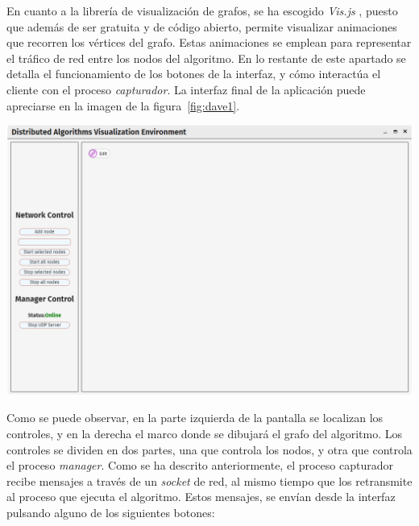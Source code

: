 En cuanto a la librería de visualización de grafos, se ha escogido \textit{Vis.js} \cite{visjs}, puesto que además de ser gratuita y de código abierto, permite visualizar animaciones que recorren los vértices del grafo. Estas animaciones se emplean para representar el tráfico de red entre los nodos del algoritmo. En lo restante de este apartado se detalla el funcionamiento de los botones de la interfaz, y cómo interactúa el cliente con el proceso \textit{capturador}. La interfaz final de la aplicación puede apreciarse en la imagen de la figura~\ref{fig:dave1}.

{
\centering
\includegraphics[width=0.9\linewidth]{imagenes/dave1}
\label{fig:dave1}
}

Como se puede observar, en la parte izquierda de la pantalla se localizan los controles, y en la derecha el marco donde se dibujará el grafo del algoritmo. Los controles se dividen en dos partes, una que controla los nodos, y otra que controla el proceso \textit{manager}. Como se ha descrito anteriormente, el proceso capturador recibe mensajes a través de un \textit{socket} de red, al mismo tiempo que los retransmite al proceso que ejecuta el algoritmo. Estos mensajes, se envían desde la interfaz pulsando alguno de los siguientes botones:

\newpage


